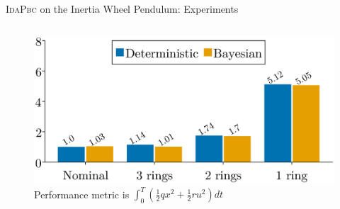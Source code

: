 \begin{frame}{\textsc{IdaPbc} on the Inertia Wheel Pendulum: Experiments}
\begin{columns}[c]
\begin{column}{0.5\linewidth}
\begin{figure}
                \includegraphics[width=0.8\linewidth, center]{figures/idapbc_bar.eps}
                \caption{\small Performance metric is $\int_0^T \left(\frac{1}{2}qx^2 + \frac{1}{2}ru^2 \right) dt$}
            \end{figure}
        \end{column}
    \end{columns}
\end{frame}

